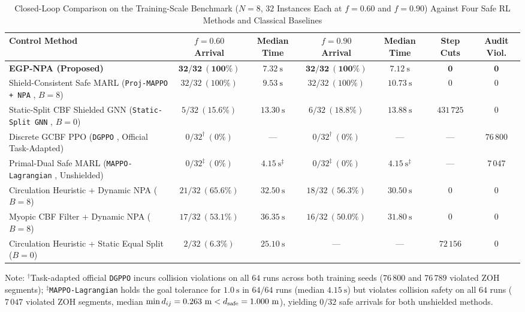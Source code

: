 \begin{table}[t]
 \centering\footnotesize
 \caption{Closed-Loop Comparison on the Training-Scale Benchmark ($N=8$, $32$ Instances Each at $f=0.60$ and $f=0.90$) Against Four Safe RL Methods and Classical Baselines}\label{tab:e1}
 \begin{tabularx}{\textwidth}{@{}Xcccccc@{}}
 \toprule
 Control Method & $f=0.60$ Arrival & Median Time & $f=0.90$ Arrival & Median Time & Step Cuts & Audit Viol.\\
 \midrule
 \textbf{EGP-NPA (Proposed)} & $\mathbf{32/32\ (100\%)}$ & $\mathbf{7.32\ \mathrm s}$ & $\mathbf{32/32\ (100\%)}$ & $\mathbf{7.12\ \mathrm s}$ & $\mathbf{0}$ & $\mathbf{0}$\\
 Shield-Consistent Safe MARL (\texttt{Proj-MAPPO + NPA} \cite{wabersich2021,liu2026saferl}, $B=8$) & $32/32\ (100\%)$ & $9.53\ \mathrm s$ & $32/32\ (100\%)$ & $10.73\ \mathrm s$ & $0$ & $0$\\
 Static-Split CBF Shielded GNN (\texttt{Static-Split GNN} \cite{ames2017cbf,zhang2025gcbf}, $B=0$) & $5/32\ (15.6\%)$ & $13.30\ \mathrm s$ & $6/32\ (18.8\%)$ & $13.88\ \mathrm s$ & $431\,725$ & $0$\\
 Discrete GCBF PPO (\texttt{DGPPO} \cite{zhang2025dgppo}, Official Task-Adapted) & $0/32^\dagger\ (0\%)$ & --- & $0/32^\dagger\ (0\%)$ & --- & --- & $76\,800$\\
 Primal-Dual Safe MARL (\texttt{MAPPO-Lagrangian} \cite{gu2023safe}, Unshielded) & $0/32^\ddagger\ (0\%)$ & $4.15\ \mathrm s^\ddagger$ & $0/32^\ddagger\ (0\%)$ & $4.15\ \mathrm s^\ddagger$ & --- & $7\,047$\\
 Circulation Heuristic \cite{goncalves2023circulation} + Dynamic NPA ($B=8$) & $21/32\ (65.6\%)$ & $32.50\ \mathrm s$ & $18/32\ (56.3\%)$ & $30.50\ \mathrm s$ & $0$ & $0$\\
 Myopic CBF Filter \cite{ames2017cbf,reis2021} + Dynamic NPA ($B=8$) & $17/32\ (53.1\%)$ & $36.35\ \mathrm s$ & $16/32\ (50.0\%)$ & $31.80\ \mathrm s$ & $0$ & $0$\\
 Circulation Heuristic + Static Equal Split \cite{ames2017cbf,zhang2025gcbf} ($B=0$) & $2/32\ (6.3\%)$ & $25.10\ \mathrm s$ & --- & --- & $72\,156$ & $0$\\
 \bottomrule
 \end{tabularx}
 \vspace{1.5pt}
 \par\raggedright\scriptsize Note: $^\dagger$Task-adapted official \texttt{DGPPO} incurs collision violations on all $64$ runs across both training seeds ($76\,800$ and $76\,789$ violated ZOH segments); $^\ddagger$\texttt{MAPPO-Lagrangian} holds the goal tolerance for $1.0\ \mathrm s$ in $64/64$ runs (median $4.15\ \mathrm s$) but violates collision safety on all $64$ runs ($7\,047$ violated ZOH segments, median $\min d_{ij}=0.263\ \mathrm m<d_{\mathrm{safe}}=1.000\ \mathrm m$), yielding $0/32$ safe arrivals for both unshielded methods.
\end{table}

